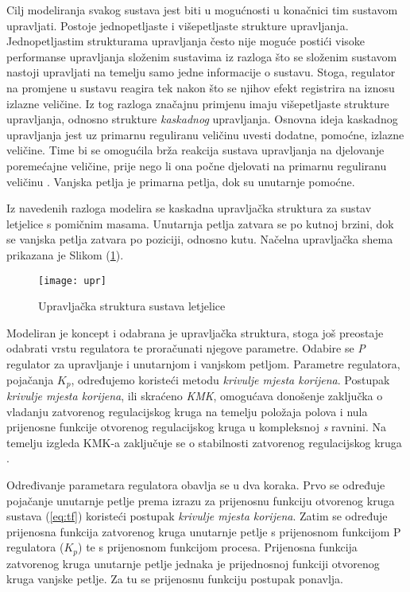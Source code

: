 \documentclass[11pt,a4paper]{article}
\begin{document}
Cilj modeliranja svakog sustava jest biti u mogućnosti u konačnici tim sustavom upravljati. Postoje jednopetljaste i višepetljaste strukture upravljanja. Jednopetljastim strukturama upravljanja često nije moguće postići visoke performanse upravljanja složenim sustavima iz razloga što se složenim sustavom nastoji upravljati na temelju samo jedne informacije o sustavu. Stoga, regulator na promjene u sustavu reagira tek nakon što se njihov efekt registrira na iznosu izlazne veličine. Iz tog razloga značajnu primjenu imaju višepetljaste strukture upravljanja, odnosno strukture \textit{kaskadnog} upravljanja. Osnovna ideja kaskadnog upravljanja jest uz primarnu reguliranu veličinu uvesti dodatne, pomoćne, izlazne veličine. Time bi se omogućila brža reakcija sustava upravljanja na djelovanje poremećajne veličine, prije nego li ona počne djelovati na primarnu reguliranu veličinu \cite{uemp}. Vanjska petlja je primarna petlja, dok su unutarnje pomoćne.   

\medskip

Iz navedenih razloga modelira se kaskadna upravljačka struktura za sustav letjelice s pomičnim masama. Unutarnja petlja zatvara se po kutnoj brzini, dok se vanjska petlja zatvara po poziciji, odnosno kutu. Načelna upravljačka shema prikazana je Slikom (\ref{fig:upr}). 


\begin{figure}[H]
	\centering
	\texttt{[image: upr]}
	\caption{Upravljačka struktura sustava letjelice}
	\label{fig:upr}
\end{figure}

\newpage

Modeliran je koncept i odabrana je upravljačka struktura, stoga još preostaje odabrati vrstu regulatora te proračunati njegove parametre. Odabire se \textit{P} regulator za upravljanje i unutarnjom i vanjskom petljom. Parametre regulatora, pojačanja $K_{p}$, određujemo koristeći metodu \textit{krivulje mjesta korijena}. Postupak \textit{krivulje mjesta korijena}, ili skraćeno \textit{KMK}, omogućava donošenje zaključka o vladanju zatvorenog regulacijskog kruga na temelju položaja polova i nula prijenosne funkcije otvorenog regulacijskog kruga u kompleksnoj \textit{s} ravnini. Na temelju izgleda KMK-a zaključuje se o stabilnosti zatvorenog regulacijskog kruga \cite{mato}. 

\medskip

Određivanje parametara regulatora obavlja se u dva koraka. Prvo se određuje pojačanje unutarnje petlje prema izrazu za prijenosnu funkciju otvorenog kruga sustava (\ref{eq:tf}) koristeći postupak \textit{krivulje mjesta korijena}. Zatim se određuje prijenosna funkcija zatvorenog kruga unutarnje petlje s prijenosnom funkcijom P regulatora ($K_{p}$) te s prijenosnom funkcijom procesa. Prijenosna funkcija zatvorenog  kruga unutarnje petlje jednaka je prijednosnoj funkciji otvorenog kruga vanjske petlje. Za tu se prijenosnu funkciju postupak ponavlja.  
\end{document}
